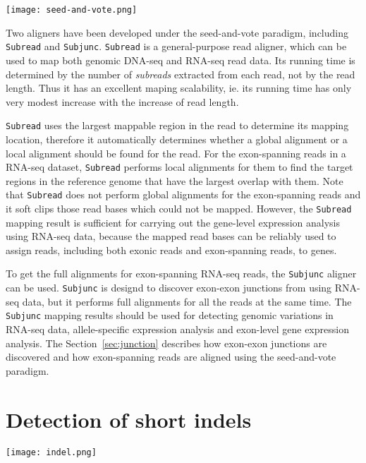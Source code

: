 \documentclass[12pt]{report}
\newcommand{\code}[1]{{\small\texttt{#1}}}
\begin{document}
\begin{center}
\texttt{[image: seed-and-vote.png]}
\end{center}

Two aligners have been developed under the seed-and-vote paradigm, including \code{Subread} and \code{Subjunc}.
\code{Subread} is a general-purpose read aligner, which can be used to map both genomic DNA-seq and RNA-seq read data.
Its running time is determined by the number of \emph{subreads} extracted from each read, not by the read length.
Thus it has an excellent maping scalability, ie. its running time has only very modest increase with the increase of read length.

\code{Subread} uses the largest mappable region in the read to determine its mapping location, therefore it automatically determines whether a global alignment or a local alignment should be found for the read.
For the exon-spanning reads in a RNA-seq dataset, \code{Subread} performs local alignments for them to find the target regions in the reference genome that have the largest overlap with them.
Note that \code{Subread} does not perform global alignments for the exon-spanning reads and it soft clips those read bases which could not be mapped.
However, the \code{Subread} mapping result is sufficient for carrying out the gene-level expression analysis using RNA-seq data, because the mapped read bases can be reliably used to assign reads, including both exonic reads and exon-spanning reads, to genes.

To get the full alignments for exon-spanning RNA-seq reads, the \code{Subjunc} aligner can be used.
\code{Subjunc} is designd to discover exon-exon junctions from using RNA-seq data, but it performs full alignments for all the reads at the same time. 
The \code{Subjunc} mapping results should be used for detecting genomic variations in RNA-seq data, allele-specific expression analysis and exon-level gene expression analysis.
The Section~\ref{sec:junction} describes how exon-exon junctions are discovered and how exon-spanning reads are aligned using the seed-and-vote paradigm.

\section{Detection of short indels}

\begin{center}
\texttt{[image: indel.png]}
\end{center}
\end{document}
